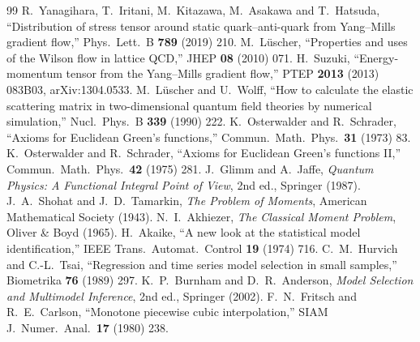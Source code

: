 \documentclass[11pt,a4paper]{article}
\theoremstyle{definition}
\theoremstyle{remark}
\begin{document}
\begin{thebibliography}{99}
 R.~Yanagihara, T.~Iritani, M.~Kitazawa, M.~Asakawa and T.~Hatsuda, ``Distribution of stress tensor around static quark--anti-quark from Yang--Mills gradient flow,'' Phys.\ Lett.\ B \textbf{789} (2019) 210.
 M.~L\"uscher, ``Properties and uses of the Wilson flow in lattice QCD,'' JHEP \textbf{08} (2010) 071.
 H.~Suzuki, ``Energy-momentum tensor from the Yang--Mills gradient flow,'' PTEP \textbf{2013} (2013) 083B03, arXiv:1304.0533.
 M.~L\"uscher and U.~Wolff, ``How to calculate the elastic scattering matrix in two-dimensional quantum field theories by numerical simulation,'' Nucl.\ Phys.\ B \textbf{339} (1990) 222.
 K.~Osterwalder and R.~Schrader, ``Axioms for Euclidean Green's functions,'' Commun.\ Math.\ Phys.\ \textbf{31} (1973) 83.
 K.~Osterwalder and R.~Schrader, ``Axioms for Euclidean Green's functions II,'' Commun.\ Math.\ Phys.\ \textbf{42} (1975) 281.
 J.~Glimm and A.~Jaffe, \emph{Quantum Physics: A Functional Integral Point of View}, 2nd ed., Springer (1987).
 J.~A.~Shohat and J.~D.~Tamarkin, \emph{The Problem of Moments}, American Mathematical Society (1943).
 N.~I.~Akhiezer, \emph{The Classical Moment Problem}, Oliver \& Boyd (1965).
 H.~Akaike, ``A new look at the statistical model identification,'' IEEE Trans.\ Automat.\ Control \textbf{19} (1974) 716.
 C.~M.~Hurvich and C.-L.~Tsai, ``Regression and time series model selection in small samples,'' Biometrika \textbf{76} (1989) 297.
 K.~P.~Burnham and D.~R.~Anderson, \emph{Model Selection and Multimodel Inference}, 2nd ed., Springer (2002).
 F.~N.~Fritsch and R.~E.~Carlson, ``Monotone piecewise cubic interpolation,'' SIAM J.\ Numer.\ Anal.\ \textbf{17} (1980) 238.
\end{thebibliography}
\end{document}
